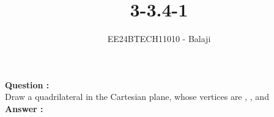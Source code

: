 \documentclass[journal]{IEEEtran}
\begin{document}

\vspace{3cm}

\title{3-3.4-1}
\author{EE24BTECH11010 - Balaji}
{\let\newpage\relax\maketitle}

\renewcommand{\thefigure}{\theenumi}
\renewcommand{\thetable}{\theenumi}
\setlength{\intextsep}{10pt} %

\renewcommand{\thetable}{\theenumi}

\textbf{Question :} \\
Draw a quadrilateral in the Cartesian plane, whose vertices are , , 
and  \\
\textbf{Answer :}\\
\begin{table}[h!]
      \centering
      
      \caption{}
\end{table}
\end{document}
